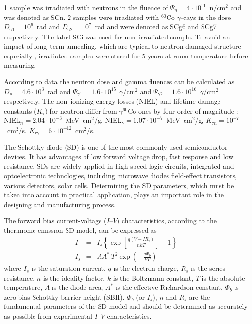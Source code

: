 \documentclass[aip,jap,reprint]{revtex4-1}
\begin{document}
1 sample  was  irradiated  with  neutrons  in  the fluence  of $\Psi_n=4\cdot10^{11}$~n/cm$^2$  and was denoted as SCn.
2 samples were irradiated  with  $^{60}$Co $\gamma$--rays in the  dose  $D_{\gamma1}=10^6$~rad and $D_{\gamma2}=10^7$~rad and were denoted as SCg6 and SCg7 respectively.
The label SCi was used for non--irradiated sample.
To avoid an impact of  long--term annealing, which are typical to neutron damaged structure especially \cite{NIEL:Moll,Rew:Srour}, irradiated samples were stored  for  5 years  at  room  temperature before measuring.

According to data \cite{NIEL:Akkerman,Brauning} the neutron dose and gamma fluences can be calculated as $D_n=4.6\cdot10^3$~rad and $\Psi_{\gamma1}=1.6\cdot10^{15}$~$\gamma$/cm$^2$ and $\Psi_{\gamma2}=1.6\cdot10^{16}$~$\gamma$/cm$^2$ respectively. 
The non--ionizing energy losses (NIEL) and lifetime damage--constants ($K_\tau$) for neutron 
differ from $\gamma^{60}$Co ones by four order of magnitude \cite{NIEL:Akkerman,NIEL:Jafari}: 
NIEL$_n=2.04\cdot10^{-3}$~MeV~cm$^2$/g, NIEL$_\gamma=1.07\cdot10^{-7}$~MeV~cm$^2$/g, $K_{\tau n}=10^{-7}$~cm$^2$/s, $K_{\tau \gamma}=5\cdot10^{-12}$~cm$^2$/s.






The Schottky diode (SD) is one of the most commonly used semiconductor devices.
It has advantages of low forward voltage drop, fast response and low resistance.
SDs are widely applied in high-speed logic circuits, integrated and optoelectronic technologies, including microwave diodes field-effect transistors, various detectors, solar cells.
Determining the SD parameters, which must be taken into account in practical application, plays an important role in the designing and manufacturing process.

The forward bias current-voltage ($I$--$V$) characteristics, according to the thermionic emission SD model, can be expressed as\cite{Rhoderick1988}
\begin{eqnarray}
\label{eqSD}
I&=&I_s\left\{\exp\left[\frac{q(V-IR_s)}{nkT}\right]-1\right\}\\
\label{eqIs}
I_s&=&AA^*\,T^2\exp\left(-\frac{q\Phi_b}{kT}\right)
\end{eqnarray}
where
$I_s$ is the saturation current,
$q$ is the electron charge,
$R_s$ is the series resistance,
$n$ is the ideality factor,
$k$ is the Boltzmann constant,
$T$ is the absolute temperature,
$A$ is the diode area,
$A^*$ is the effective Richardson constant,
$\Phi_b$ is zero bias Schottky barrier height (SBH).
$\Phi_b$ (or $I_s$), $n$ and $R_s$ are the fundamental parameters of the SD model and should be determined as accurately as possible from experimental $I$--$V$ characteristics.
\end{document}
